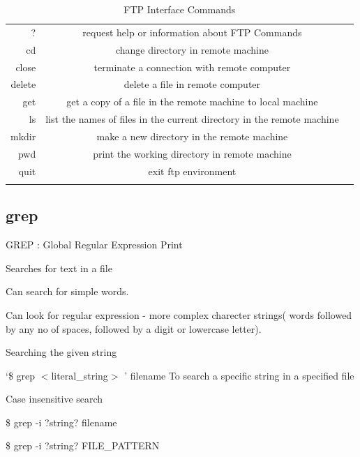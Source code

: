 \documentclass{article}
\begin{document}
\begin{table}[htb]
\caption {FTP Interface Commands}
\label {Common Commands}
\begin{tabular}{rcc}
\noalign{\smallskip}\hline\hline\noalign{\smallskip}
? & request help or information about FTP Commands\\
cd & change directory in remote machine\\
close & terminate a connection with remote computer\\
delete & delete a file in remote computer\\
get & get a copy of a file in the remote machine to local machine\\
ls & list the names of files in the current directory in the remote machine\\
mkdir & make a new directory in the remote machine\\
pwd & print the working directory in remote machine\\
quit & exit ftp environment\\
\noalign{\smallskip}\hline\hline\noalign{\smallskip}

\end{tabular}
\end{table}

\subsection{grep}

GREP : Global Regular Expression Print \cite{grepweb}

 	\hspace{10mm}Searches for text in a file
	
 	\hspace{10mm}Can search for simple words.
	
 	\hspace{10mm}Can look for regular expression - more complex charecter strings( words followed by any no of spaces, followed by a digit or lowercase letter).


	Searching the given string

		     \hspace{10mm}`\$ grep $<$literal\_string$>$ ' filename To search a specific string in a specified file


	Case insensitive search
	
			        \hspace{10mm}\$ grep -i ?string? filename
			        
       				\hspace{10mm}\$ grep -i ?string? FILE\_PATTERN\*
				
\end{document}
